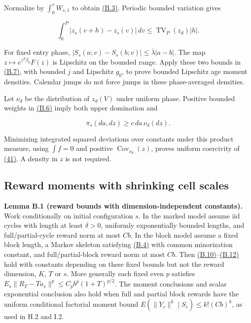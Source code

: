 \documentclass[11pt]{article}
\begin{document}
Normalize by \(\int_0^\tau W_{s,1}\) to obtain \hyperref[eq:B.3]{(B.3)}. Periodic bounded variation gives

\begin{equation*}
\int_0^P|z_s(v+h)-z_s(v)|\,dv
\leq \operatorname{TV}_P(z_d)|h|.
\tag{B.8}\label{eq:B.8}
\end{equation*}

For fixed entry phase, \(|S_s(a;v)-S_s(b;v)|\leq\overline\lambda|a-b|\). The map \(z\mapsto e^{z^T\beta_0}F(z)\) is Lipschitz on the bounded range. Apply these two bounds in \hyperref[eq:B.7]{(B.7)}, with bounded \(j\) and Lipschitz \(g_0\), to prove bounded Lipschitz age moment densities. Calendar jumps do not force jumps in these phase-averaged densities.

Let \(\nu_d\) be the distribution of \(z_d(V)\) under uniform phase. Positive bounded weights in \hyperref[eq:B.6]{(B.6)} imply both upper domination and

\begin{equation*}
\pi_s(da,dz)\geq c\,da\,\nu_d(dz).
\tag{B.9}\label{eq:B.9}
\end{equation*}

Minimizing integrated squared deviations over constants under this product measure, using \(\int f=0\) and positive \(\operatorname{Cov}_{\nu_d}(z)\), proves uniform coercivity of \hyperref[eq:41]{(41)}. A density in \(z\) is not required.

\subsection{Reward moments with shrinking cell scales}\label{sec:B.3}

\label{res:Lemma-B.1}
\textbf{Lemma B.1 (reward bounds with dimension-independent constants).} Work conditionally on initial configuration \(s\). In the marked model assume iid cycles with length at least \(\delta>0\), uniformly exponentially bounded lengths, and full/partial-cycle reward norm at most \(Cb\). In the block model assume a fixed block length, a Markov skeleton satisfying \hyperref[eq:B.4]{(B.4)} with common minorization constant, and full/partial-block reward norm at most \(Cb\). Then \hyperref[eq:B.10]{(B.10)}--\hyperref[eq:B.12]{(B.12)} hold with constants depending on these fixed bounds but not the reward dimension, \(K\), \(T\) or \(s\). More generally each fixed even \(p\) satisfies \(E_s\|R_T-Ta_s\|^p\le C_pb^p(1+T)^{p/2}\). The moment conclusions and scalar exponential conclusion also hold when full and partial block rewards have the uniform conditional factorial moment bound \(E(\|Y_r\|^k\mid S_r)\le k!(Cb)^k\), as used in H.2 and I.2.
\end{document}
